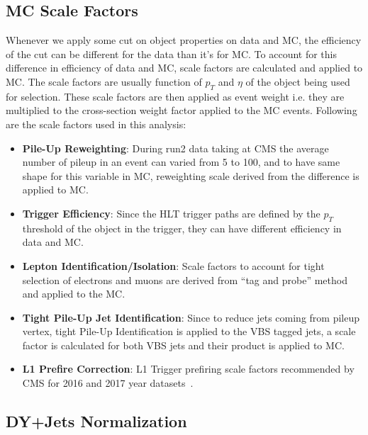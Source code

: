 \subsection{
  MC Scale Factors
}

Whenever we apply some cut on object properties on data and \gls{MC},
the efficiency of the cut can be different for the data than it's for
\gls{MC}. To account for this difference in efficiency
of data and \gls{MC}, scale factors are calculated and applied
to \gls{MC}. The scale factors are usually function of
\( p_T \) and \( \eta \) of the object being used for selection.
These scale factors are then applied as event weight i.e.
they are multiplied to the cross-section weight factor applied to the \gls{MC}
events.
Following are the scale factors used in this analysis:

\begin{itemize}
  \item \textbf{Pile-Up Reweighting}: During run2 data taking at \gls{CMS}
        the average number of pileup in an event can varied from 5 to 100,
        and to have same shape for this variable in \gls{MC}, reweighting
        scale derived from the difference is applied to \gls{MC}.
  \item \textbf{Trigger Efficiency}: Since the \gls{HLT} trigger paths are defined
        by the \( p_T \) threshold of the object in the trigger,
        they can have different efficiency in data and \gls{MC}.
  \item \textbf{Lepton Identification/Isolation}:
        Scale factors to account for tight selection
        of electrons and muons are
        derived from ``tag and probe'' method and applied to the \gls{MC}.
  \item \textbf{Tight Pile-Up Jet Identification}:
        Since to reduce jets coming from pileup vertex, tight Pile-Up Identification
        is applied to the \gls{VBS} tagged jets, a scale factor
        is calculated for both \gls{VBS} jets and their product
        is applied to \gls{MC}.
  \item \textbf{L1 Prefire Correction}: L1 Trigger prefiring
        scale factors recommended by \gls{CMS} for 2016 and 2017 year datasets~\cite{cms-l1t}.
\end{itemize}

\subsection{
  DY+Jets Normalization
}

